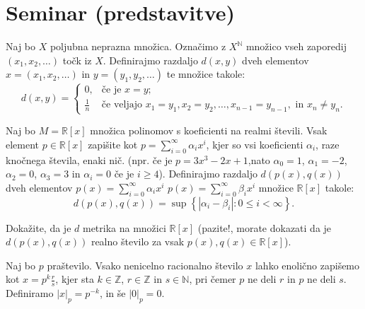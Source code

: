 \documentclass[11pt,a4paper]{exam}
\renewcommand{\leq}{\leqslant} %
\renewcommand{\geq}{\geqslant}
\renewcommand{\{}{\lbrace}
\renewcommand{\}}{\rbrace}
\begin{document}
\section*{Seminar (predstavitve)}
	\begin{questions}
		\question Naj bo $X$ poljubna neprazna množica. Označimo z $X^{\mathbb{N}}$ množico vseh zaporedij  $(x_{1}, x_{2}, \dots)$ točk iz $X$. Definirajmo razdaljo $d(x,y)$ dveh elementov $x=(x_{1}, x_{2}, \dots)$ in $y=(y_{1}, y_{2}, \dots)$ te množice takole: \[d(x,y) = \begin{cases} 0, & \text{če je } x=y;  \\ \frac{1}{n} & \text{če veljajo } x_{1}=y_{1}, x_{2}= y_{2}, \dots, x_{n-1} = y_{n-1}, \text{ in } x_{n} \neq y_{n}. \end{cases}\]

		\question Naj bo $M=\mathbb{R}[x]$ množica polinomov s koeficienti na realmi števili. Vsak element $p \in \mathbb{R}[x]$ zapišite kot $p = \sum_{i=0}^{\infty} \alpha_i x^{i}$, kjer so vsi koeficienti $\alpha_{i}$, raze knočnega števila, enaki nič. (npr. če je $p = 3x^{3} - 2x +1$,nato $\alpha_{0} = 1$, $\alpha_{1} =- 2$, $\alpha_{2} = 0$, $\alpha_{3} = 3$ in $\alpha_{i} = 0 $ če je $i \geq 4$). Definirajmo razdaljo $d \left( p(x), q(x) \right)$ dveh elementov $p(x) = \sum_{i=0}^{\infty} \alpha_{i} x^{i}$  $p(x) = \sum_{i=0}^{\infty} \beta_{i} x^{i}$ množice $\mathbb{R}[x]$ takole: \[d \left( p(x), q(x) \right) = \sup \left\{ \left| \alpha_{i} - \beta_{i} \right| : 0 \leq i < \infty \right\}.\]
		
		Dokažite, da je $d$ metrika na množici $\mathbb{R}[x]$ (pazite!, morate dokazati da je $d \left( p(x), q(x) \right)$ realno število za vsak $p(x), q(x) \in \mathbb{R}[x]$).

		\question Naj bo $p$ praštevilo. Vsako nenicelno racionalno število $x$ lahko enolično zapišemo kot $x = p^k \frac{r}{s}$, kjer sta $k \in \mathbb{Z}$, $r \in \mathbb{Z}$ in $s \in \mathbb{N}$, pri čemer $p$ ne deli $r$ in $p$ ne deli $s$. Definiramo $|x|_p = p^{-k}$, in še $|0|_p = 0$.


\end{questions}
\end{document}
